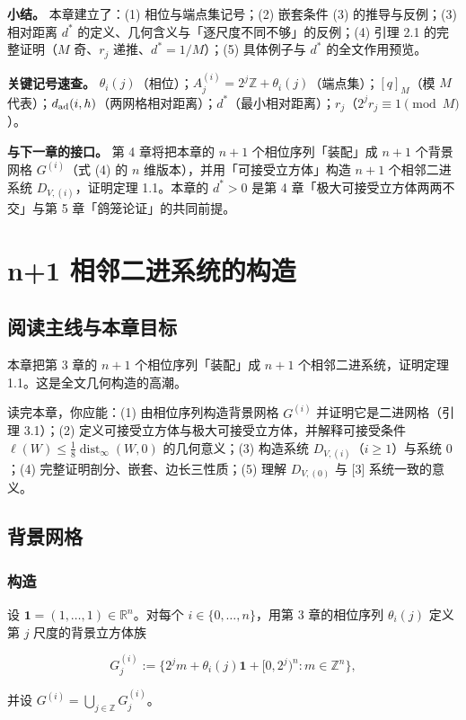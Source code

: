 \documentclass[a4paper,11pt,openany]{ctexbook}
\numberwithin{equation}{chapter}
\numberwithin{figure}{chapter}
\numberwithin{table}{chapter}
\begin{document}
\textbf{小结。} 本章建立了：(1) 相位与端点集记号；(2) 嵌套条件 (3) 的推导与反例；(3) 相对距离 $d^*$ 的定义、几何含义与「逐尺度不同不够」的反例；(4) 引理 2.1 的完整证明（$M$ 奇、$r_j$ 递推、$d^*=1/M$）；(5) 具体例子与 $d^*$ 的全文作用预览。

\textbf{关键记号速查。} $\theta_i(j)$（相位）；$A_j^{(i)}=2^j\mathbb Z+\theta_i(j)$（端点集）；$[q]_M$（模 $M$ 代表）；$d_{\rm ad}(i,h)$（两网格相对距离）；$d^*$（最小相对距离）；$r_j$（$2^j r_j\equiv1\pmod M$）。

\textbf{与下一章的接口。} 第 4 章将把本章的 $n+1$ 个相位序列「装配」成 $n+1$ 个背景网格 $G^{(i)}$（式 (4) 的 $n$ 维版本），并用「可接受立方体」构造 $n+1$ 个相邻二进系统 $D_{V,(i)}$，证明定理 1.1。本章的 $d^*>0$ 是第 4 章「极大可接受立方体两两不交」与第 5 章「鸽笼论证」的共同前提。


\clearpage

\chapter{n+1 相邻二进系统的构造}
\section{阅读主线与本章目标}

本章把第 3 章的 $n+1$ 个相位序列「装配」成 $n+1$ 个相邻二进系统，证明定理 1.1。这是全文几何构造的高潮。

读完本章，你应能：(1) 由相位序列构造背景网格 $G^{(i)}$ 并证明它是二进网格（引理 3.1）；(2) 定义可接受立方体与极大可接受立方体，并解释可接受条件 $\ell(W)\le\frac18\operatorname{dist}_\infty(W,0)$ 的几何意义；(3) 构造系统 $D_{V,(i)}$（$i\ge1$）与系统 $0$；(4) 完整证明剖分、嵌套、边长三性质；(5) 理解 $D_{V,(0)}$ 与 [3] 系统一致的意义。

\section{背景网格}

\subsection{构造}

设 $\mathbf1=(1,\dots,1)\in\mathbb R^n$。对每个 $i\in\{0,\dots,n\}$，用第 3 章的相位序列 $\theta_i(j)$ 定义第 $j$ 尺度的背景立方体族

$$G_j^{(i)}:=\{2^j m+\theta_i(j)\mathbf1+[0,2^j)^n : m\in\mathbb Z^n\},$$

并设 $G^{(i)}=\bigcup_{j\in\mathbb Z}G_j^{(i)}$。
\end{document}
